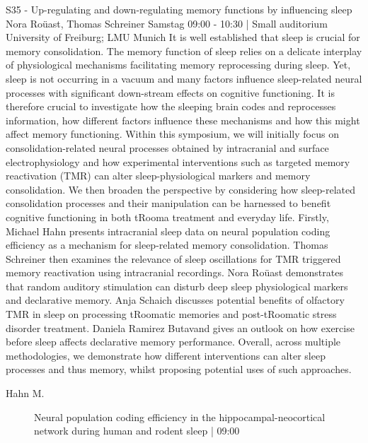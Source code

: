 
            \begin{symposium}
            {S35 - Up-regulating and down-regulating memory functions by influencing sleep}
            {Nora Roüast, Thomas Schreiner}
            {Samstag 09:00 - 10:30 | Small auditorium}
            {University of Freiburg; LMU Munich}
            It is well established that sleep is crucial for memory consolidation. The memory function of sleep relies on a delicate interplay of physiological mechanisms facilitating memory reprocessing during sleep. Yet, sleep is not occurring in a vacuum and many factors influence sleep-related neural processes with significant down-stream effects on cognitive functioning. It is therefore crucial to investigate how the sleeping brain codes and reprocesses information, how different factors influence these mechanisms and how this might affect memory functioning.
Within this symposium, we will initially focus on consolidation-related neural processes obtained by intracranial and surface electrophysiology and how experimental interventions such as targeted memory reactivation (TMR) can alter sleep-physiological markers and memory consolidation. We then broaden the perspective by considering how sleep-related consolidation processes and their manipulation can be harnessed to benefit cognitive functioning in both tRooma treatment and everyday life.
Firstly, Michael Hahn presents intracranial sleep data on neural population coding efficiency as a mechanism for sleep-related memory consolidation. Thomas Schreiner then examines the relevance of sleep oscillations for TMR triggered memory reactivation using intracranial recordings. Nora Roüast demonstrates that random auditory stimulation can disturb deep sleep physiological markers and declarative memory. Anja Schaich discusses potential benefits of olfactory TMR in sleep on processing tRoomatic memories and post-tRoomatic stress disorder treatment. Daniela Ramirez Butavand gives an outlook on how exercise before sleep affects declarative memory performance.
Overall, across multiple methodologies, we demonstrate how different interventions can alter sleep processes and thus memory, whilst proposing potential uses of such approaches.
            \begin{description}    
            
                \item [ Hahn M.] Neural population coding efficiency in the hippocampal-neocortical network during human and rodent sleep \textcolor{mygray}{ | 09:00}    
                

\end{description}
\end{symposium}
